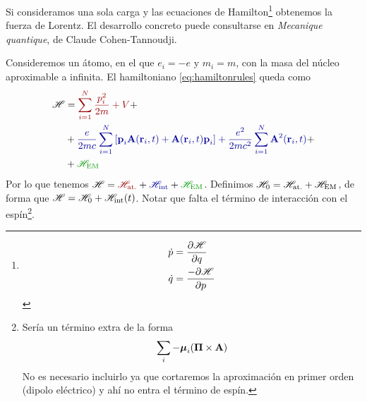 Si consideramos una sola carga y las ecuaciones de Hamilton\footnote{
  \begin{align*}
    \dot{p} &= \pdv{\mathscr{H}}{q}\\
    \dot{q} &= \frac{-\partial \mathscr{H}}{\partial p}
  \end{align*}
} obtenemos la fuerza de Lorentz. El desarrollo concreto puede
consultarse en \emph{Mecanique quantique}, de Claude Cohen-Tannoudji.

Consideremos un átomo, en el que $e_i=-e$ y $m_i=m$, con la masa del
núcleo aproximable a infinita. El hamiltoniano \eqref{eq:hamiltonrules} queda como
\begin{equation}
  \begin{split}
  \Ham &= 
  \textcolor{red!60!black}{
  \sum_{i=1}^N \frac{p_i^2}{2m} + V 
  }
  + \\
  &+ 
  \textcolor{blue!60!black}{
  \frac{e}{2mc} \sum_{i=1}^N \left[ \boldrm{p}_i
    \boldrm{A}(\boldrm{r}_i,t) + \boldrm{A}(\boldrm{r}_i,t) \boldrm{p}_i \right]+
    \frac{e^2}{2mc^2} \sum_{i=1}^N \boldrm{A}^2(\boldrm{r}_i,t)
    }
  + \\
    &+
    \textcolor{green!60!black}{
 \Ham_\text{EM}
 }
  \end{split}
  \label{eq:aynomames}
\end{equation}
Por lo que tenemos $\Ham = 
 \textcolor{red!60!black}{\Ham_\text{at.}}
+\textcolor{blue!60!black}{\Ham_\text{int}}
+\textcolor{green!60!black}{\Ham_\text{EM}}$. Definimos $\mathscr{H}_0 =
\mathscr{H}_\text{at.}+\mathscr{H}_\text{EM}$, de forma que $\mathscr{H} =
\mathscr{H}_0+\mathscr{H}_\text{int}(t)$. Notar que falta el término de interacción
con el espín\footnote[][-3cm]{Sería un término extra de la
  forma \[\sum_{i}-\bm{\mathrm{\mu}}_i(\bm{\mathrm{\Pi}}\times \bm{\mathrm{A}})\]No
  es necesario incluirlo ya que cortaremos la aproximación en primer
  orden (dipolo eléctrico) y ahí no entra el término de espín.}.

